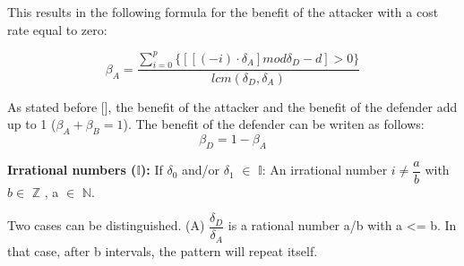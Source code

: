 This results in the following formula for the benefit of the attacker with a cost rate equal to zero:

\begin{equation}\label{first}
\beta_{A} = \dfrac{\sum_{i=0}^{p} \lbrace [[(  - i ) \cdot \delta_{A}] mod \delta_{D} - d] > 0 \rbrace }{lcm(\delta_{D},\delta_{A})} 
\end{equation}

As stated before [], the benefit of the attacker and the benefit of the defender add up to 1 ($\beta_{A} + \beta_{B} = 1$). The benefit of the defender can be writen as follows:
\begin{equation}\label{first}
\beta_{D} = 1 - \beta_{A}
\end{equation}

\textbf{Irrational numbers (\(\mathbb{I}\)):} If $\delta_{0}$ and/or $\delta_{1}$ $\in$ \(\mathbb{I}\):
An irrational number $ i \neq \dfrac{a}{b}$ with $b \in$ \(\mathbb{Z}\) , a $\in$ \(\mathbb{N}\).

Two cases can be distinguished.
(A) $\dfrac{\delta_{D}}{ \delta_{A}}$ is a rational number a/b with a <= b. In that case, after b intervals, the pattern will repeat itself.


